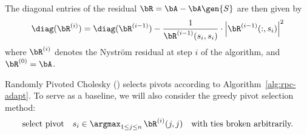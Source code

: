 The diagonal entries of the residual $\bR = \bA - \bA\gen{S}$ are then given by
\[\diag(\bR^{(i)}) = \diag(\bR^{(i-1)}) - \frac{1}{\bR^{(i-1)}(s_i, s_i)}\cdot \left|\bR^{(i-1)}(:, s_i)\right|^2\]
where $\bR^{(i)}$ denotes the Nystr\"om residual at step $i$ of the algorithm, and $\bR^{(0)} = \bA$.

Randomly Pivoted Cholesky (\RPCholesky) selects pivots according to Algorithm~\ref{alg:rpc-adapt}. To serve as a baseline, we will also consider the greedy pivot selection method:
\[\text{select pivot}\quad s_i \in \argmax_{1\leq j\leq n}\,{\bR^{(i)}(j, j)}\quad\text{with ties broken arbitrarily.}\]







